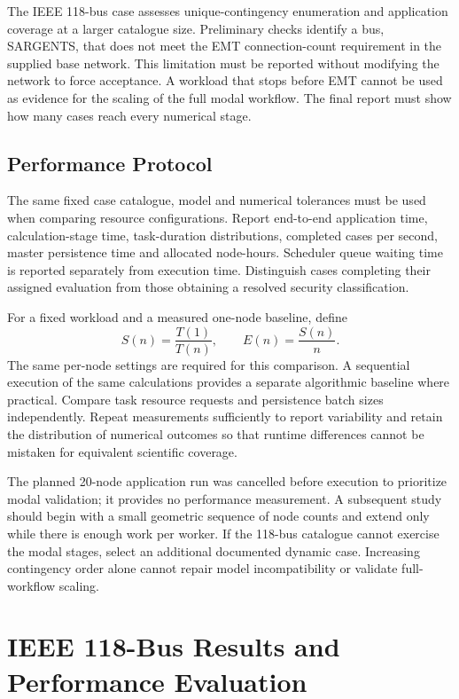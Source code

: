 \documentclass[journal]{IEEEtran}
\begin{document}
The IEEE 118-bus case assesses unique-contingency enumeration and application coverage at a larger catalogue size. Preliminary checks identify a bus, SARGENTS, that does not meet the EMT connection-count requirement in the supplied base network. This limitation must be reported without modifying the network to force acceptance. A workload that stops before EMT cannot be used as evidence for the scaling of the full modal workflow. The final report must show how many cases reach every numerical stage.

\subsection{Performance Protocol}
The same fixed case catalogue, model and numerical tolerances must be used when comparing resource configurations. Report end-to-end application time, calculation-stage time, task-duration distributions, completed cases per second, master persistence time and allocated node-hours. Scheduler queue waiting time is reported separately from execution time. Distinguish cases completing their assigned evaluation from those obtaining a resolved security classification.

For a fixed workload and a measured one-node baseline, define
\begin{equation}
S(n)=\frac{T(1)}{T(n)}, \qquad E(n)=\frac{S(n)}{n}.
\end{equation}
The same per-node settings are required for this comparison. A sequential execution of the same calculations provides a separate algorithmic baseline where practical. Compare task resource requests and persistence batch sizes independently. Repeat measurements sufficiently to report variability and retain the distribution of numerical outcomes so that runtime differences cannot be mistaken for equivalent scientific coverage.

The planned 20-node application run was cancelled before execution to prioritize modal validation; it provides no performance measurement. A subsequent study should begin with a small geometric sequence of node counts and extend only while there is enough work per worker. If the 118-bus catalogue cannot exercise the modal stages, select an additional documented dynamic case. Increasing contingency order alone cannot repair model incompatibility or validate full-workflow scaling.

\section{IEEE 118-Bus Results and Performance Evaluation}
\end{document}
